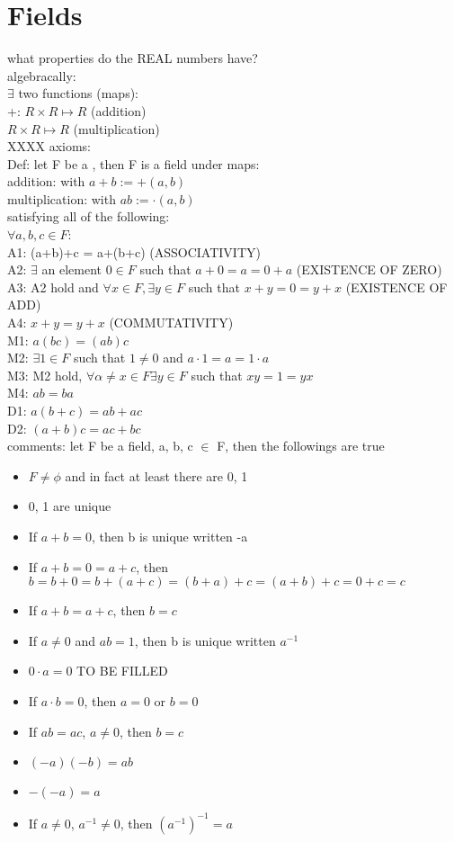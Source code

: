 \documentclass[11pt]{article}
\begin{document}
\doublespacing
\section{Fields}
what properties do the REAL numbers have?\\
algebracally: \\
$\exists$ two functions (maps): \\
+: $R \times R \mapsto R$ (addition) \\
$R \times R \mapsto R$ (multiplication)\\
XXXX axioms:\\
Def: let F be a , then F is a field under maps:\\
addition: with $a+b:=+(a, b)$\\
multiplication: with $ab:=\cdot (a, b)$\\
satisfying all of the following:\\
$\forall a, b, c \in F$:\\
A1: (a+b)+c = a+(b+c) (ASSOCIATIVITY)\\
A2: $\exists$ an element $0 \in F$ such that $a+0=a=0+a$ (EXISTENCE OF ZERO)\\
A3: A2 hold and $\forall x \in F, \exists y\in F$ such that $x+y=0=y+x$ (EXISTENCE OF ADD)\\
A4: $x+y=y+x$ (COMMUTATIVITY)\\
M1: $a(bc)=(ab)c$\\
M2: $\exists 1\in F$ such that $1\neq 0$ and $a\cdot 1 = a = 1\cdot a$\\
M3: M2 hold, $\forall \alpha \neq x \in F \exists y \in F$ such that $xy=1=yx$\\
M4: $ab=ba$\\
D1: $a(b+c)=ab+ac$\\
D2: $(a+b)c=ac+bc$\\
comments: let F be a field, a, b, c $\in$ F, then the followings are true\\
\begin{itemize}
\singlespacing
	\item $F \neq \phi$ and in fact at least there are 0, 1
	\item 0, 1 are unique
	\item If $a+b=0$, then b is unique written -a
	\item If $a+b=0=a+c$, then $b=b+0=b+(a+c)=(b+a)+c=(a+b)+c=0+c=c$
	\item If $a+b=a+c$, then $b=c$
	\item If $a \neq 0$ and $ab=1$, then b is unique written $a^{-1}$
	\item $0\cdot a=0$ TO BE FILLED
	\item If $a\cdot b=0$, then $a=0$ or $b=0$
	\item If $ab=ac$, $a\neq 0$, then $b=c$
	\item $(-a)(-b)=ab$
	\item $-(-a)=a$
	\item If $a\neq 0$, $a^{-1}\neq 0$, then $(a^{-1})^{-1}=a$
\end{itemize}
\end{document}
